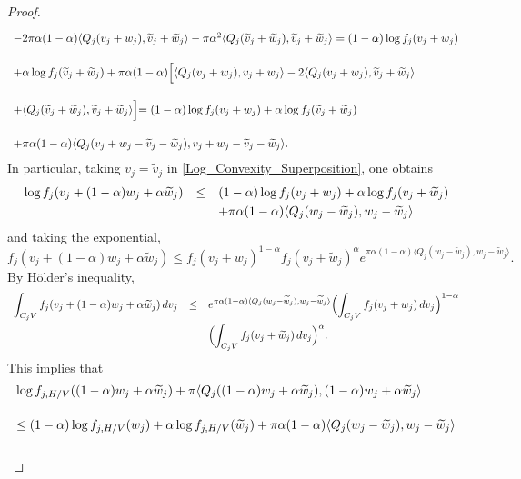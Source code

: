 \documentclass[11pt,a4paper,reqno]{amsart}
\numberwithin{equation}{section}
\theoremstyle{definition}
\newcommand{\nm}{\noalign{\smallskip}}
\newcommand{\ds}{\displaystyle}
\renewcommand{\tilde}{\widetilde}
\newcommand{\<}{\ensuremath \leq}
\renewcommand{\>}{\ensuremath \geq}
\renewcommand{\tilde}{\widetilde}
\begin{document}
\begin{proof}
\begin{equation}
\begin{array}{lll}
    \nm 
    -2\pi \alpha(1-\alpha)\langle Q_j(v_j+w_j),\tilde v_j+\tilde w_j \rangle   -\pi \alpha^2 \langle Q_j(\tilde v_j+\tilde w_j),\tilde v_j+\tilde w_j  \rangle = (1-\alpha) \log f_j(v_j+w_j) \\ \\
    \nm 
    +\alpha \log f_j(\tilde v_j+\tilde w_j)+\pi \alpha(1-\alpha) \Bigl[ \langle Q_j(v_j+w_j),v_j+w_j\rangle-2\langle Q_j(v_j+w_j), \tilde v_j+\tilde w_j \rangle \\ \\
    \nm 
    +\langle Q_j(\tilde v_j+\tilde w_j),\tilde v_j+\tilde w_j \rangle \Bigl]=(1-\alpha) \log f_j(v_j+w_j)+\alpha \log f_j(\tilde v_j+\tilde w_j) \\ \\
    \nm 
    +\pi \alpha(1-\alpha) \langle Q_j(v_j+w_j-\tilde v_j-\tilde w_j),v_j+w_j-\tilde v_j-\tilde w_j \rangle.
    \end{array} \end{equation}
    In particular, taking $v_j=\tilde v_j$ in \cref{Log_Convexity_Superposition}, one obtains $$\begin{array}{lll}\log f_j(v_j+(1-\alpha)w_j+\alpha \tilde w_j) &\leq& (1-\alpha)\log f_j(v_j+w_j)+\alpha \log f_j(v_j+\tilde w_j) \\
    \nm 
    && +\pi \alpha(1-\alpha) \langle Q_j(w_j-\tilde w_j),w_j-\tilde w_j\rangle \end{array}$$ and taking the exponential, $$f_j(v_j+(1-\alpha)w_j+\alpha \tilde w_j) \leq f_j(v_j+w_j)^{1-\alpha}f_j(v_j+\tilde w_j)^{\alpha} e^{\pi \alpha (1-\alpha) \langle Q_j(w_j-\tilde w_j),w_j-\tilde w_j\rangle}.$$ By Hölder's inequality, $$\begin{array}{lll}
    \ds \int_{C_jV}f_j(v_j+(1-\alpha)w_j+\alpha \tilde w_j) \, dv_j &\leq& \ds e^{\pi \alpha(1-\alpha) \langle Q_j(w_j-\tilde w_j),w_j-\tilde w_j\rangle} \Bigl( \int_{C_jV}f_j(v_j+w_j)\, dv_j \Bigl)^{1-\alpha} \\
    \nm 
    && \ds \Bigl ( \int_{C_jV}f_j(v_j+\tilde w_j)\, dv_j\Bigl)^{\alpha}.
    \end{array}$$ This implies that $$\begin{array}{lll}
    \log f_{j,H/V}((1-\alpha)w_j+\alpha \tilde w_j)+\pi \langle Q_j((1-\alpha)w_j+\alpha \tilde w_j),(1-\alpha)w_j+\alpha \tilde w_j \rangle \\ \\
    \nm 
    \leq (1-\alpha)\log f_{j,H/V}(w_j)+\alpha \log f_{j,H/V}(\tilde w_j)+\pi \alpha(1-\alpha) \langle Q_j(w_j-\tilde w_j),w_j-\tilde w_j \rangle \\ \\

\end{array}$$
\end{proof}
\end{document}
